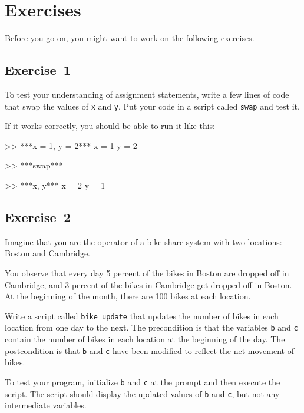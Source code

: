 \section{Exercises}

Before you go on, you might want to work on the following exercises.

\subsection{Exercise~1}
To test your understanding of assignment statements, write a few lines of code that swap the values of \lstinline{x} and \lstinline{y}. 
Put your code in a script called \lstinline{swap} and test it.

If it works correctly, you should be able to run it like this:

\begin{code}
>> ***x = 1, y = 2***
x = 1
y = 2

>> ***swap***

>> ***x, y***
x = 2
y = 1
\end{code}





\subsection{Exercise~2}
\label{bikegame}

Imagine that you are the operator of a bike share system with two
locations: Boston and Cambridge.

You observe that every day 5 percent
of the bikes in Boston are dropped off in Cambridge, and 3 percent of the bikes
in Cambridge get dropped off in Boston.
At the beginning of the month, there are 100 bikes at each location.

Write a script called \lstinline{bike_update} that updates the number
of bikes in each location from one day to the next.  The precondition
is that the variables \lstinline{b} and \lstinline{c} contain the number of bikes
in each location at the beginning of the day.  The postcondition
is that \lstinline{b} and \lstinline{c} have been modified to reflect the net movement of bikes.

To test your program, initialize \lstinline{b} and \lstinline{c} at
the prompt and then execute the script.  The script should display
the updated values of \lstinline{b} and \lstinline{c}, but not any intermediate
variables.

